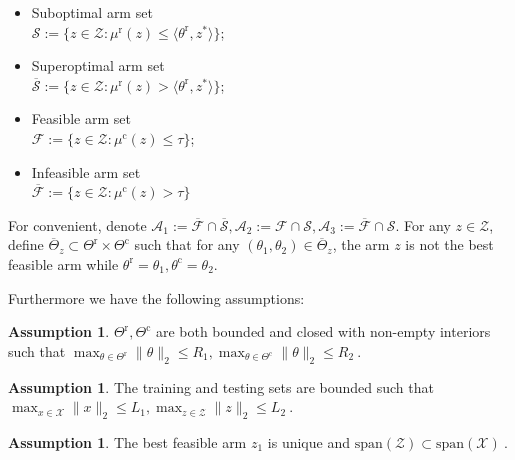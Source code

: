 \documentclass[accepted]{uai2025} %
\theoremstyle{plain}
\theoremstyle{definition}
\newtheorem{assumption}[theorem]{Assumption}
\theoremstyle{remark}
\newcommand{\thetac}{\theta^{\mathrm{c}}}
\newcommand{\thetar}{\theta^{\mathrm{r}}}
\newcommand{\muc}{\mu^{\mathrm{c}}}
\newcommand{\mur}{\mu^{\mathrm{r}}}
\newcommand{\cbr}[1]{\left\{#1\right\}}
\begin{document}
\begin{itemize}[itemsep=0pt, parsep=0pt, topsep=0pt]
    \item Suboptimal arm set \\$\mathcal{S} := \{ z\in \mathcal{Z}: \mu^{\mathrm{r}}(z)\le \langle\theta^{\mathrm{r}}, z^* \rangle   \}$;
    \item Superoptimal arm set \\$\overline{\mathcal{S}} := \{ z\in \mathcal{Z}: \mu^{\mathrm{r}}(z)> \langle\theta^{\mathrm{r}}, z^* \rangle   \}$;
    \item Feasible arm set \\ $\mathcal{F} := \{ z \in \mathcal{Z}: \mu^{\mathrm{c}}(z)\le \tau \}$;
    \item Infeasible arm set  \\$\overline{\mathcal{F}} := \{ z \in \mathcal{Z}: \mu^{\mathrm{c}}(z)> \tau \}$
\end{itemize}
For convenient, denote $\mathcal{A}_1:= \overline{\mathcal{F}}\cap \overline{\mathcal{S}}, \mathcal{A}_2:= {\mathcal{F}}\cap {\mathcal{S}}, \mathcal{A}_3:= \overline{\mathcal{F}}\cap {\mathcal{S}} $. For any $z\in \mathcal{Z}$, define $\overline{\Theta}_z \subset \Theta^\mathrm{r} \times \Theta^\mathrm{c}$ such that for any $(\theta_1, \theta_2) \in \overline{\Theta}_z$, the arm $z$ is not the best feasible arm while $\thetar=\theta_1, \thetac=\theta_2$.



Furthermore we have the following assumptions:
\begin{assumption}
\label{ass1}
    $\Theta^\mathrm{r}, \Theta^\mathrm{c}$ are both bounded and closed with non-empty interiors such that $\max_{\theta \in \Theta^\mathrm{r}} \lVert \theta \rVert_2 \le R_1, \max_{\theta \in \Theta^\mathrm{c}} \lVert \theta \rVert_2 \le R_2~.$
\end{assumption}
\begin{assumption}
\label{ass2}
    The training and testing sets are bounded such that $\max_{x \in \mathcal{X}} \lVert x \rVert_2 \le L_1, \max_{z \in \mathcal{Z}} \lVert z \rVert_2 \le L_2~.$
\end{assumption}
\begin{assumption}
\label{ass3}
    The best feasible arm $z_1$ is unique and $\text{span}(\mathcal{Z}) \subset \text{span}(\mathcal{X})~.$
\end{assumption}
\end{document}
